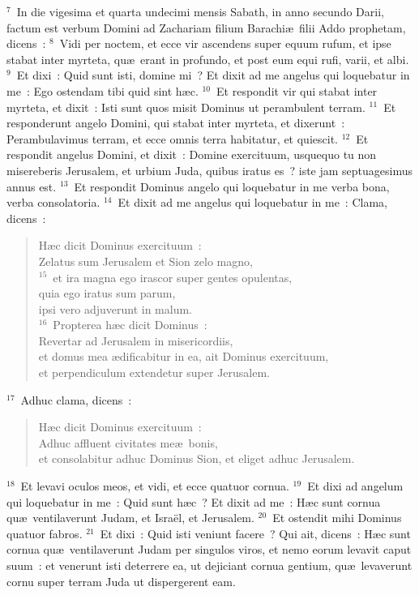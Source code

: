 ${}^{7}$~In die vigesima et quarta undecimi mensis Sabath, in anno secundo Darii, factum est verbum Domini ad Zachariam filium Barachi\ae\ filii Addo prophetam, dicens~:
${}^{8}$~Vidi per noctem, et ecce vir ascendens super equum rufum, et ipse stabat inter myrteta, qu\ae\ erant in profundo, et post eum equi rufi, varii, et albi.
${}^{9}$~Et dixi~: Quid sunt isti, domine mi~? Et dixit ad me angelus qui loquebatur in me~: Ego ostendam tibi quid sint h\ae c.
${}^{10}$~Et respondit vir qui stabat inter myrteta, et dixit~: Isti sunt quos misit Dominus ut perambulent terram.
${}^{11}$~Et responderunt angelo Domini, qui stabat inter myrteta, et dixerunt~: Perambulavimus terram, et ecce omnis terra habitatur, et quiescit.
${}^{12}$~Et respondit angelus Domini, et dixit~: Domine exercituum, usquequo tu non misereberis Jerusalem, et urbium Juda, quibus iratus es~? iste jam septuagesimus annus est.
${}^{13}$~Et respondit Dominus angelo qui loquebatur in me verba bona, verba consolatoria.
${}^{14}$~Et dixit ad me angelus qui loquebatur in me~: Clama, dicens~: \begin{flushleft}\begin{verse}H\ae c dicit Dominus exercituum~:\\ Zelatus sum Jerusalem et Sion zelo magno,\\
${}^{15}$~et ira magna ego irascor super gentes opulentas,\\ quia ego iratus sum parum,\\ ipsi vero adjuverunt in malum.\\
${}^{16}$~Propterea h\ae c dicit Dominus~:\\ Revertar ad Jerusalem in misericordiis,\\ et domus mea \ae dificabitur in ea, ait Dominus exercituum,\\ et perpendiculum extendetur super Jerusalem.\end{verse}\end{flushleft}


${}^{17}$~Adhuc clama, dicens~: \begin{flushleft}\begin{verse}H\ae c dicit Dominus exercituum~:\\ Adhuc affluent civitates me\ae\ bonis,\\ et consolabitur adhuc Dominus Sion, et eliget adhuc Jerusalem.\end{verse}\end{flushleft}


${}^{18}$~Et levavi oculos meos, et vidi, et ecce quatuor cornua.
${}^{19}$~Et dixi ad angelum qui loquebatur in me~: Quid sunt h\ae c~? Et dixit ad me~: H\ae c sunt cornua qu\ae\ ventilaverunt Judam, et Isra\"el, et Jerusalem.
${}^{20}$~Et ostendit mihi Dominus quatuor fabros.
${}^{21}$~Et dixi~: Quid isti veniunt facere~? Qui ait, dicens~: H\ae c sunt cornua qu\ae\ ventilaverunt Judam per singulos viros, et nemo eorum levavit caput suum~: et venerunt isti deterrere ea, ut dejiciant cornua gentium, qu\ae\ levaverunt cornu super terram Juda ut dispergerent eam.


